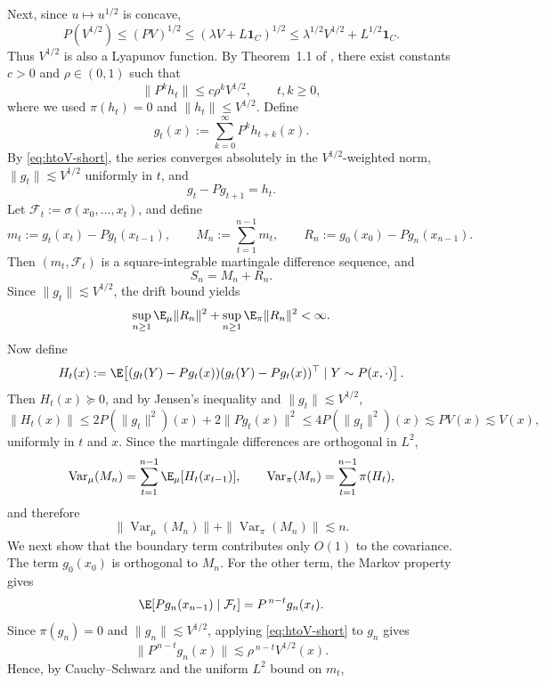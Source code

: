\documentclass[mnsc,nonblindrev]{informs3}
\begin{document}
Next, since \(u\mapsto u^{1/2}\) is concave,
\[
P(V^{1/2}) \le (PV)^{1/2}
\le (\lambda V + L\mathbf 1_C)^{1/2}
\le \lambda^{1/2}V^{1/2} + L^{1/2}\mathbf 1_C .
\]
Thus \(V^{1/2}\) is also a Lyapunov function. By Theorem~1.1 of
\cite{baxendale2005renewal}, there exist constants \(c>0\) and \(\rho\in(0,1)\) such that
\begin{equation}\label{eq:htoV-short}
\|P^k h_t\| \le c\rho^k V^{1/2},
\qquad t,k\ge 0,
\end{equation}
where we used \(\pi(h_t)=0\) and \(\|h_t\|\le V^{1/2}\). Define
\[
g_t(x):=\sum_{k=0}^\infty P^k h_{t+k}(x).
\]
By \eqref{eq:htoV-short}, the series converges absolutely in the
\(V^{1/2}\)-weighted norm, \(\|g_t\|\lesssim V^{1/2}\) uniformly in \(t\), and
\[
g_t-Pg_{t+1}=h_t.
\]
Let \(\mathcal F_t:=\sigma(x_0,\dots,x_t)\), and define
\[
m_t:=g_t(x_t)-Pg_t(x_{t-1}),\qquad
M_n:=\sum_{t=1}^{n-1}m_t,\qquad
R_n:=g_0(x_0)-Pg_n(x_{n-1}).
\]
Then \((m_t,\mathcal F_t)\) is a square-integrable martingale difference sequence, and
\begin{equation}\label{eq:Sn-decomp-short}
S_n=M_n+R_n .
\end{equation}
Since \(\|g_t\|\lesssim V^{1/2}\), the drift bound yields
\begin{equation}\label{eq:Rn-short}
\sup_{n\ge 1}\E_\mu\|R_n\|^2+\sup_{n\ge 1}\E_\pi\|R_n\|^2<\infty.
\end{equation}
Now define
\[
H_t(x):=\E\!\left[(g_t(Y)-Pg_t(x))(g_t(Y)-Pg_t(x))^\top\mid Y\sim P(x,\cdot)\right].
\]
Then \(H_t(x)\succeq 0\), and by Jensen's inequality and \(\|g_t\|\lesssim V^{1/2}\),
\[
\|H_t(x)\|
\le 2P(\|g_t\|^2)(x)+2\|Pg_t(x)\|^2
\le 4P(\|g_t\|^2)(x)
\lesssim PV(x)\lesssim V(x),
\]
uniformly in \(t\) and \(x\). Since the martingale differences are orthogonal in \(L^2\),
\[
\operatorname{Var}_\mu(M_n)=\sum_{t=1}^{n-1}\E_\mu[H_t(x_{t-1})],
\qquad
\operatorname{Var}_\pi(M_n)=\sum_{t=1}^{n-1}\pi(H_t),
\]
and therefore
\begin{equation}\label{eq:Mn-short}
\|\operatorname{Var}_\mu(M_n)\|+\|\operatorname{Var}_\pi(M_n)\|\lesssim n.
\end{equation}
We next show that the boundary term contributes only \(O(1)\) to the covariance.
The term \(g_0(x_0)\) is orthogonal to \(M_n\). For the other term, the Markov property gives
\[
\E[Pg_n(x_{n-1})\mid \mathcal F_t]=P^{\,n-t}g_n(x_t).
\]
Since \(\pi(g_n)=0\) and \(\|g_n\|\lesssim V^{1/2}\), applying
\eqref{eq:htoV-short} to \(g_n\) gives
\[
\|P^{\,n-t}g_n(x)\|\lesssim \rho^{\,n-t}V^{1/2}(x).
\]
Hence, by Cauchy--Schwarz and the uniform \(L^2\) bound on \(m_t\),
\end{document}
